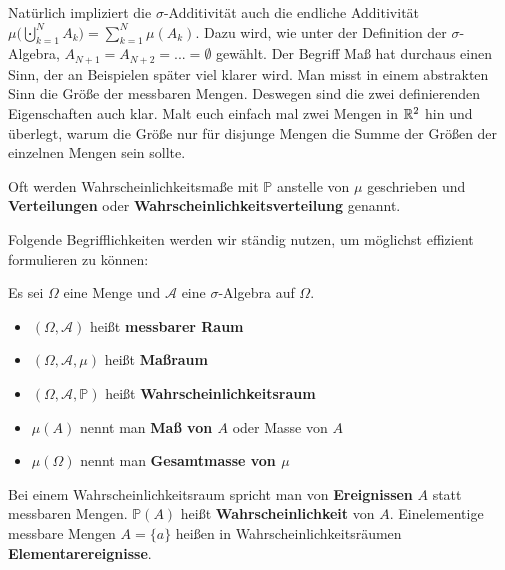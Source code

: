 Nat\"urlich impliziert die $\sigma$-Additivit\"at auch die endliche Additivit\"at $\mu\Big(\bigcupdot\limits_{k=1}^{N}A_{k}\Big)=\sum\limits_{k=1}^{N}\mu (A_{k}).$ Dazu wird, wie unter der Definition der $\sigma$-Algebra, $A_{N+1}=A_{N+2}=...=\emptyset$ gew\"ahlt. Der Begriff \glqq Ma\ss \grqq{} hat durchaus einen Sinn, der an Beispielen sp\"ater viel klarer wird. Man misst in einem abstrakten Sinn die Gr\"o\ss e der messbaren Mengen. Deswegen sind die zwei definierenden Eigenschaften auch klar. Malt euch einfach mal zwei Mengen in $\mathbb{R}^2$ hin und \"uberlegt, warum die \glqq Gr\"o\ss e\grqq{} nur f\"ur disjunge Mengen die Summe der \glqq Gr\"o\ss en\grqq{} der einzelnen Mengen sein sollte.

\begin{lwarnhinweis}
\begin{bem} 
Oft werden Wahrscheinlichkeitsmaße mit $\mathbb P$ anstelle von $\mu$ geschrieben und \textbf{Verteilungen} oder \textbf{Wahrscheinlichkeitsverteilung} genannt.
\end{bem}
\end{lwarnhinweis}
Folgende Begrifflichkeiten werden wir st\"andig nutzen, um m\"oglichst effizient formulieren zu k\"onnen: 
\begin{ldef}
\begin{deff} 
	Es sei $\Omega$ eine Menge und $\mathcal A$ eine $\sigma$-Algebra auf $\Omega$.
	\begin{itemize}
		\item $(\Omega, \mathcal{A})$ heißt \textbf{messbarer Raum}
		\item $(\Omega, \mathcal{A}, \mu)$ heißt \textbf{Maßraum}
		\item $(\Omega, \mathcal{A}, \mathbb P)$ heißt \textbf{Wahrscheinlichkeitsraum}
		\item $\mu (A)$ nennt man \textbf{Maß von $A$} oder Masse von $A$
		\item $\mu(\Omega)$ nennt man \textbf{Gesamtmasse von $\mu$}
	\end{itemize}

\end{deff}
\end{ldef}
\begin{lwarnhinweis}
\begin{bem} 
	Bei einem Wahrscheinlichkeitsraum spricht man von \textbf{Ereignissen} $A$ statt messbaren Mengen. $\mathbb P(A)$ heißt \textbf{Wahrscheinlichkeit} von $A$. Einelementige messbare Mengen $A = \{a\}$ heißen in Wahrscheinlichkeitsräumen \textbf{Elementarereignisse}.
\end{bem}
\end{lwarnhinweis}

